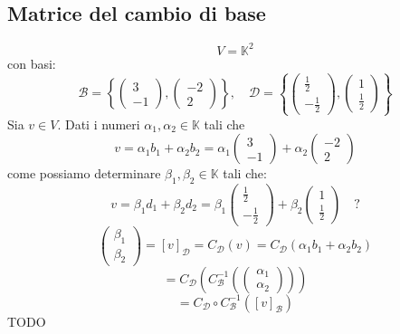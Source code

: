 \documentclass[a4paper]{article}
\theoremstyle{break}
\theoremstyle{break}
\theoremstyle{break}
\theoremstyle{break}
\begin{document}
\subsection{Matrice del cambio di base}
\begin{example}
  \[
  V = \mathbb{K}^2
  \] 
  con basi:
  \[
  \mathcal{B} = \left\{
    \begin{pmatrix} 
      3\\-1
    \end{pmatrix} ,
    \begin{pmatrix} 
      -2\\2
    \end{pmatrix} 
  \right\} , \quad
  \mathcal{D} = \left\{
    \begin{pmatrix} 
      \frac{1}{2}\\-\frac{1}{2}
    \end{pmatrix} ,
    \begin{pmatrix} 
      1\\\frac{1}{2}
    \end{pmatrix}
  \right\}
  \] 
  Sia \( v \in V \). Dati i numeri \( \alpha_1, \alpha_2 \in \mathbb{K} \) tali che
  \[ v = \alpha_1b_1 + \alpha_2b_2 = \alpha_1 \begin{pmatrix} 
    3\\-1
  \end{pmatrix} +
  \alpha_2 \begin{pmatrix} 
    -2\\2
  \end{pmatrix} 
\] 
come possiamo determinare \( \beta_1, \beta_2 \in \mathbb{K} \) tali che:
\[
v = \beta_1d_1 + \beta_2d_2 = \beta_1 \begin{pmatrix} 
  \frac{1}{2}\\-\frac{1}{2}
\end{pmatrix} +
\beta_2 \begin{pmatrix} 
  1\\\frac{1}{2}
\end{pmatrix} \quad ?
\] 
\[
  \begin{pmatrix} \beta_1\\\beta_2 \end{pmatrix} = [v]_{\mathcal{D}} = C_{\mathcal{D}}(v)
  = C_{\mathcal{D}}\left( \alpha_1 b_1 + \alpha_2 b_2 \right)
\] 
\[
  = C_{\mathcal{D}}\left( C_{\mathcal{B}}^{-1} \left(\begin{pmatrix} 
      \alpha_1\\
      \alpha_2
    \end{pmatrix} 
  \right)  \right)  
\] 
\[
  = C_{\mathcal{D}} \circ C_{\mathcal{B}}^{-1} \left( [v]_{\mathcal{B}} \right)
\] 
TODO


\end{example}
\end{document}
